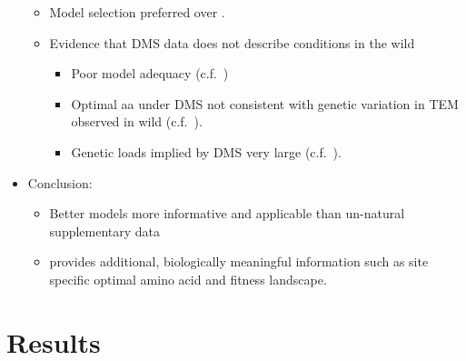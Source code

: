 \documentclass[12pt]{article}
\begin{document}
\begin{itemize}
	\begin{itemize}
        \item Model selection preferred \selac over \phydms.
        \item Evidence that DMS data does not describe conditions in the wild
          \begin{itemize}
          \item Poor model adequacy (c.f.~\selac)
          \item Optimal aa under DMS not consistent with genetic variation in TEM observed in wild (c.f.~\selac).
          \item Genetic loads implied by DMS very large (c.f.~\selac).
          \end{itemize}
        \end{itemize}
      \item Conclusion:
        \begin{itemize}
        \item Better models more informative and applicable than un-natural supplementary data
        \item \selac provides additional, biologically meaningful information such as site specific optimal amino acid and fitness landscape.
        \end{itemize}
\end{itemize}

\section*{Results}
\end{document}
